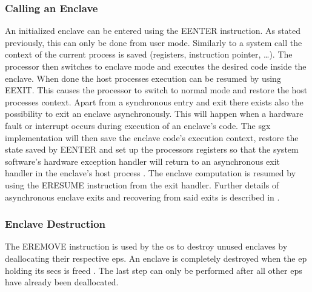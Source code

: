 \subsubsection{Calling an Enclave}
An initialized enclave can be entered using the EENTER instruction. As stated previously, this can only be done from user mode. Similarly to a system call the context of the current
process is saved (registers, instruction pointer, \dots). The processor then switches to enclave mode and executes the desired code inside the enclave. When done the host processes
execution can be resumed by using EEXIT. This causes the processor to switch to normal mode and restore the host processes context. Apart from a synchronous entry and exit there
exists also the possibility to exit an enclave asynchronously. This will happen when a hardware fault or interrupt occurs during execution of an enclave's code. The \ac{sgx}
implementation will then save the enclave code's execution context, restore the state saved by EENTER and set up the processors registers so that the system software’s hardware 
exception handler will return to an asynchronous exit handler in the enclave’s host process \cite{Costan2016IntelSE}. The enclave computation is resumed by using the ERESUME
instruction from the exit handler. Further details of asynchronous enclave exits and recovering from said exits is described in \cite{Costan2016IntelSE}.

\subsubsection{Enclave Destruction}
The EREMOVE instruction is used by the \ac{os} to destroy unused enclaves by deallocating their respective \acp{ep}. An enclave is completely destroyed when the \ac{ep} holding its \ac{secs} is freed
\cite{Costan2016IntelSE}. The last step can only be performed after all other \acp{ep} have already been deallocated.

